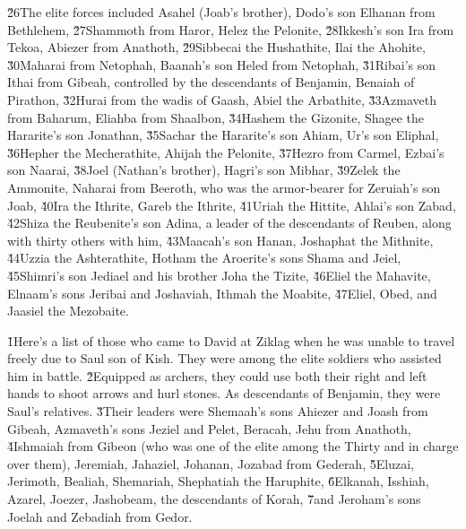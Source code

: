 \v{26}The elite forces included Asahel (Joab's brother), Dodo's son Elhanan from Bethlehem, \v{27}Shammoth from Haror, Helez the Pelonite, \v{28}Ikkesh's son Ira from Tekoa, Abiezer from Anathoth, \v{29}Sibbecai the Hushathite, Ilai the Ahohite, \v{30}Maharai from Netophah, Baanah's son Heled from Netophah, \v{31}Ribai's son Ithai from Gibeah, controlled by the descendants of Benjamin, Benaiah of Pirathon, \v{32}Hurai from the wadis of Gaash, Abiel the Arbathite, \v{33}Azmaveth from Baharum, Eliahba from Shaalbon, \v{34}Hashem the Gizonite, Shagee the Hararite's son Jonathan, \v{35}Sachar the Hararite's son Ahiam, Ur's son Eliphal, \v{36}Hepher the Mecherathite, Ahijah the Pelonite, \v{37}Hezro from Carmel, Ezbai's son Naarai, \v{38}Joel (Nathan's brother), Hagri's son Mibhar, \v{39}Zelek the Ammonite, Naharai from Beeroth, who was the armor-bearer for Zeruiah's son Joab, \v{40}Ira the Ithrite, Gareb the Ithrite, \v{41}Uriah the Hittite, Ahlai's son Zabad, \v{42}Shiza the Reubenite's son Adina, a leader of the descendants of Reuben, along with thirty others with him, \v{43}Maacah's son Hanan, Joshaphat the Mithnite, \v{44}Uzzia the Ashterathite, Hotham the Aroerite's sons Shama and Jeiel, \v{45}Shimri's son Jediael and his brother Joha the Tizite, \v{46}Eliel the Mahavite, Elnaam's sons Jeribai and Joshaviah, Ithmah the Moabite, \v{47}Eliel, Obed, and Jaasiel the Mezobaite.

\v{1}Here's a list of those who came to David at Ziklag when he was unable to travel freely due to Saul son of Kish. They were among the elite soldiers who assisted him in battle. \v{2}Equipped as archers, they could use both their right and left hands to shoot arrows and hurl stones. As descendants of Benjamin, they were Saul's relatives. \v{3}Their leaders were Shemaah's sons Ahiezer and Joash from Gibeah, Azmaveth's sons Jeziel and Pelet, Beracah, Jehu from Anathoth, \v{4}Ishmaiah from Gibeon (who was one of the elite among the Thirty and in charge over them), Jeremiah, Jahaziel, Johanan, Jozabad from Gederah, \v{5}Eluzai, Jerimoth, Bealiah, Shemariah, Shephatiah the Haruphite, \v{6}Elkanah, Isshiah, Azarel, Joezer, Jashobeam, the descendants of Korah, \v{7}and Jeroham's sons Joelah and Zebadiah from Gedor.

